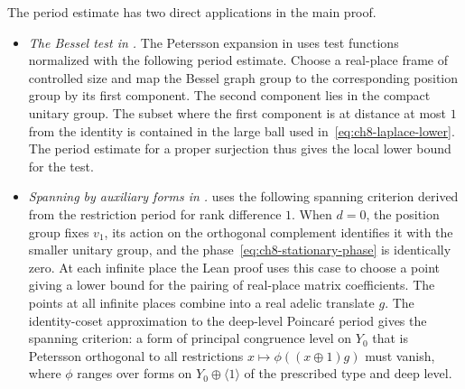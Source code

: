 The period estimate has two direct applications in the main proof.
\begin{itemize}
\item {}\label{use:ch8-bessel}\emph{The Bessel test in .} The Petersson expansion in  uses test functions normalized with the following period estimate. Choose a real-place frame of controlled size and map the Bessel graph group to the corresponding position group by its first component. The second component lies in the compact unitary group. The subset where the first component is at distance at most $1$ from the identity is contained in the large ball used in~\eqref{eq:ch8-laplace-lower}. The period estimate for a proper surjection thus gives the local lower bound for the test.
\item {}\label{use:ch8-restriction}\emph{Spanning by auxiliary forms in .}  uses the following spanning criterion derived from the restriction period for rank difference $1$. When $d=0$, the position group fixes $v_1$, its action on the orthogonal complement identifies it with the smaller unitary group, and the phase~\eqref{eq:ch8-stationary-phase} is identically zero. At each infinite place the Lean proof uses this case to choose a point giving a lower bound for the pairing of real-place matrix coefficients. The points at all infinite places combine into a real adelic translate $g$. The identity-coset approximation to the deep-level Poincaré period gives the spanning criterion: a form of principal congruence level on $Y_0$ that is Petersson orthogonal to all restrictions $x\mapsto\phi((x\oplus1)g)$ must vanish, where $\phi$ ranges over forms on $Y_0\oplus\langle1\rangle$ of the prescribed type and deep level.
\end{itemize}
